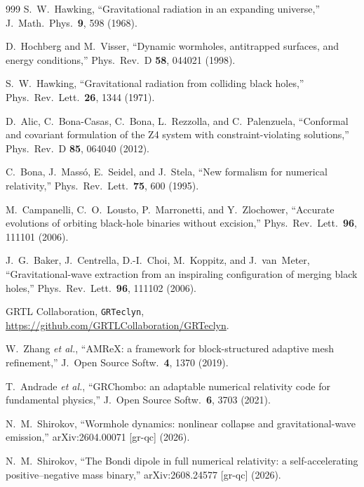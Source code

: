 \documentclass[twocolumn,floatfix,aps,prd,superscriptaddress,nofootinbib,showkeys]{revtex4-2}
\begin{document}
\begin{thebibliography}{999}
S.~W.~Hawking,
\newblock ``Gravitational radiation in an expanding universe,''
\newblock J.\ Math.\ Phys.\ \textbf{9}, 598 (1968).

D.~Hochberg and M.~Visser,
\newblock ``Dynamic wormholes, antitrapped surfaces, and energy conditions,''
\newblock Phys.\ Rev.\ D \textbf{58}, 044021 (1998).

S.~W.~Hawking,
\newblock ``Gravitational radiation from colliding black holes,''
\newblock Phys.\ Rev.\ Lett.\ \textbf{26}, 1344 (1971).

D.~Alic, C.~Bona-Casas, C.~Bona, L.~Rezzolla, and C.~Palenzuela,
\newblock ``Conformal and covariant formulation of the Z4 system with constraint-violating solutions,''
\newblock Phys.\ Rev.\ D \textbf{85}, 064040 (2012).

C.~Bona, J.~Mass\'o, E.~Seidel, and J.~Stela,
\newblock ``New formalism for numerical relativity,''
\newblock Phys.\ Rev.\ Lett.\ \textbf{75}, 600 (1995).

M.~Campanelli, C.~O.~Lousto, P.~Marronetti, and Y.~Zlochower,
\newblock ``Accurate evolutions of orbiting black-hole binaries without excision,''
\newblock Phys.\ Rev.\ Lett.\ \textbf{96}, 111101 (2006).

J.~G.~Baker, J.~Centrella, D.-I.~Choi, M.~Koppitz, and J.~van~Meter,
\newblock ``Gravitational-wave extraction from an inspiraling configuration of merging black holes,''
\newblock Phys.\ Rev.\ Lett.\ \textbf{96}, 111102 (2006).

GRTL Collaboration,
\newblock \texttt{GRTeclyn},
\newblock \url{https://github.com/GRTLCollaboration/GRTeclyn}.

W.~Zhang \emph{et al.},
\newblock ``AMReX: a framework for block-structured adaptive mesh refinement,''
\newblock J.\ Open Source Softw.\ \textbf{4}, 1370 (2019).

T.~Andrade \emph{et al.},
\newblock ``GRChombo: an adaptable numerical relativity code for fundamental physics,''
\newblock J.\ Open Source Softw.\ \textbf{6}, 3703 (2021).

N.~M.~Shirokov,
\newblock ``Wormhole dynamics: nonlinear collapse and gravitational-wave emission,''
\newblock arXiv:2604.00071 [gr-qc] (2026).

N.~M.~Shirokov,
\newblock ``The Bondi dipole in full numerical relativity: a self-accelerating positive--negative mass binary,''
\newblock arXiv:2608.24577 [gr-qc] (2026).


\end{thebibliography}
\end{document}

